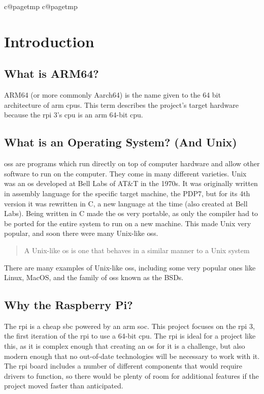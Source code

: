 \documentclass{article}
\makeatletter
\newcommand{\mypagenumbering}[1]{%
    \ifcsname c@pagetmp\endcsname
    \else
        \newcounter{pagetmp}
    \fi
    \setcounter{pagetmp}{\value{page}}
    \pagenumbering{#1}
    \setcounter{page}{\value{pagetmp}}
}
\makeatother
\begin{document}
{\mypagenumbering{roman}\hypersetup{hidelinks} \tableofcontents}
\clearpage
\mypagenumbering{arabic}

\section{Introduction}
\subsection{What is ARM64?}
ARM64 (or more commonly Aarch64) is the name given to the 64 bit architecture
of \gls{arm} \glspl{cpu}. This term describes the project's target hardware
because the \gls{rpi} 3's \gls{cpu} is an \gls{arm} 64-bit \gls{cpu}.

\subsection{What is an Operating System? (And Unix)}
\glspl{os} are programs which run directly on top of computer hardware and
allow other software to run on the computer. They come in many different
varieties. Unix was an \gls{os} developed at Bell Labs of AT\&T in the 1970s.
It was originally written in assembly language for the specific target machine,
the PDP7, but for its 4th version it was rewritten in C, a new language at the
time (also created at Bell Labs). Being written in C made the \gls{os} very
portable, as only the compiler had to be ported for the entire system to run on
a new machine. This made Unix very popular, and soon there were many Unix-like
\glspl{os}. \blockquote[\cite{unix-like}]{A Unix-like \gls{os} is one that
behaves in a similar manner to a Unix system}. There are many examples of
Unix-like \glspl{os}, including some very popular ones like Linux, MacOS, and
the family of \glspl{os} known as the BSDs.

\subsection{Why the Raspberry Pi?}
The \gls{rpi} is a cheap \gls{sbc} powered by an \gls{arm} \gls{soc}. This
project focuses on the \gls{rpi} 3, the first iteration of the \gls{rpi} to use
a 64-bit \gls{cpu}. The \gls{rpi} is ideal for a project like this, as it is
complex enough that creating an \gls{os} for it is a challenge, but also modern
enough that no out-of-date technologies will be necessary to work with it. The
\gls{rpi} board includes a number of different components that would require
drivers to function, so there would be plenty of room for additional features
if the project moved faster than anticipated.
\end{document}
